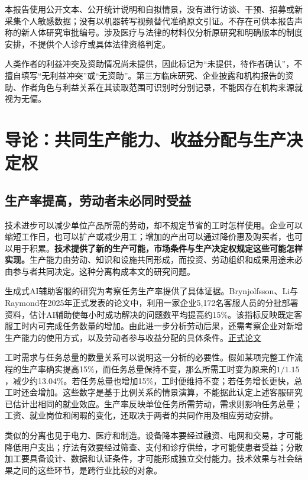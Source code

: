 \documentclass[UTF8,fontset=windows,12pt,a4paper,oneside,openany]{ctexbook}
\begin{document}
本报告使用公开文本、公开统计说明和自拟情景，没有进行访谈、干预、招募或新采集个人敏感数据；没有以机器转写视频替代准确原文引证。不存在可供本报告声称的新人体研究审批编号。涉及医疗与法律的材料仅分析原研究和明确版本的制度安排，不提供个人诊疗或具体法律资格判定。

人类作者的利益冲突及资助情况尚未提供，因此标记为“未提供，待作者确认”，不擅自填写“无利益冲突”或“无资助”。第三方临床研究、企业披露和机构报告的资助、作者角色与利益关系在其读取范围可识别时分别记录，不能因存在机构来源就视为无偏。

\tableofcontents\mainmatter

\chapter{导论：共同生产能力、收益分配与生产决定权}\label{ch:1}

\section{生产率提高，劳动者未必同时受益}

技术进步可以减少单位产品所需的劳动，却不规定节省的工时怎样使用。企业可以缩短工作日，也可以扩产或减少用工；增加的产出可以通过降价惠及购买者，也可以用于积累。\textbf{技术提供了新的生产可能，市场条件与生产决定权规定这些可能怎样实现。}生产能力由劳动、知识和设施共同形成，而投资、劳动组织和成果用途未必由参与者共同决定。这种分离构成本文的研究问题。

生成式AI辅助客服的研究为考察任务生产率提供了具体证据。Brynjolfsson、Li与Raymond在2025年正式发表的论文中，利用一家企业5,172名客服人员的分批部署资料，估计AI辅助使每小时成功解决的问题数平均提高约15\%。该指标反映既定客服工时内可完成任务数量的增加。由此进一步分析劳动后果，还需考察企业对新增生产能力的使用方式，以及劳动者参与收益分配的具体条件。\href{https://doi.org/10.1093/qje/qjae044}{正式论文}

工时需求与任务总量的数量关系可以说明这一分析的必要性。假如某项完整工作流程的生产率确实提高15\%，而任务总量保持不变，那么所需工时变为原来的\(1/1.15\)，减少约13.04\%。若任务总量也增加15\%，工时便维持不变；若任务增长更快，总工时还会增加。这些数字是基于比例关系的情景演算，不能据此认定上述客服研究已估计出相同的就业效应。生产率反映单位任务所需劳动，需求则影响任务总量；工资、就业岗位和闲暇的变化，还取决于两者的共同作用及相应劳动安排。

类似的分离也见于电力、医疗和制造。设备降本要经过融资、电网和交易，才可能降低用户支出；疗法有效要经过筛查、支付和诊疗供给，才可能使患者受益；分散加工要具备设计、数据和认证条件，才可能形成独立交付能力。技术效果与社会结果之间的这些环节，是跨行业比较的对象。
\end{document}
